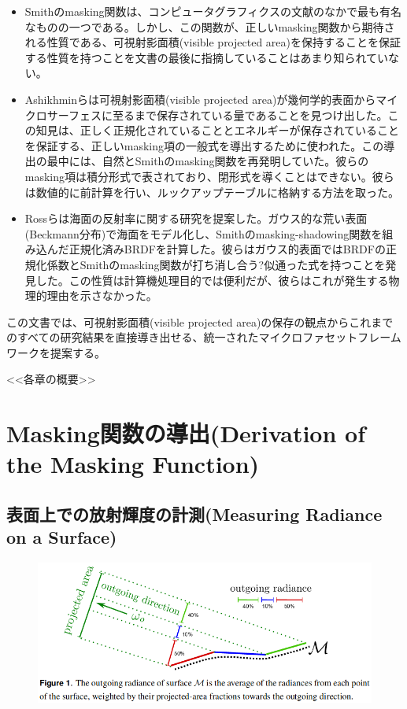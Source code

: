 \documentclass[a4j,xelatex,ja=standard]{bxjsarticle}
\begin{document}
\begin{itemize}
\item Smithのmasking関数は、コンピュータグラフィクスの文献のなかで最も有名なものの一つである。しかし、この関数が、正しいmasking関数から期待される性質である、可視射影面積(visible projected area)を保持することを保証する性質を持つことを文書の最後に指摘していることはあまり知られていない。

\item Ashikhminらは可視射影面積(visible projected area)が幾何学的表面からマイクロサーフェスに至るまで保存されている量であることを見つけ出した。この知見は、正しく正規化されていることとエネルギーが保存されていることを保証する、正しいmasking項の一般式を導出するために使われた。この導出の最中には、自然とSmithのmasking関数を再発明していた。彼らのmasking項は積分形式で表されており、閉形式を導くことはできない。彼らは数値的に前計算を行い、ルックアップテーブルに格納する方法を取った。

\item Rossらは海面の反射率に関する研究を提案した。ガウス的な荒い表面(Beckmann分布)で海面をモデル化し、Smithのmasking-shadowing関数を組み込んだ正規化済みBRDFを計算した。彼らはガウス的表面ではBRDFの正規化係数とSmithのmasking関数が打ち消し合う?似通った式を持つことを発見した。この性質は計算機処理目的では便利だが、彼らはこれが発生する物理的理由を示さなかった。
\end{itemize}

この文書では、可視射影面積(visible projected area)の保存の観点からこれまでのすべての研究結果を直接導き出せる、統一されたマイクロファセットフレームワークを提案する。

<<各章の概要>>

\section{Masking関数の導出(Derivation of the Masking Function)}

\subsection{表面上での放射輝度の計測(Measuring Radiance on a Surface)}
\label{sec:2.1}

\begin{figure}
    \includegraphics[width=\textwidth]{Figure1.png}
    \caption{}
    \label{fig:1}
\end{figure}
\end{document}
